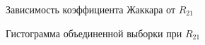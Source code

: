 \begin{figure}[H]
	\caption{Зависимость коэффициента Жаккара от $R_{21}$}
	\label{ris:hist2}
\end{figure}

\begin{figure}[H]
	\caption{Гистограмма объединенной выборки при $R_{21}$}
	\label{ris:hist2}
\end{figure}
